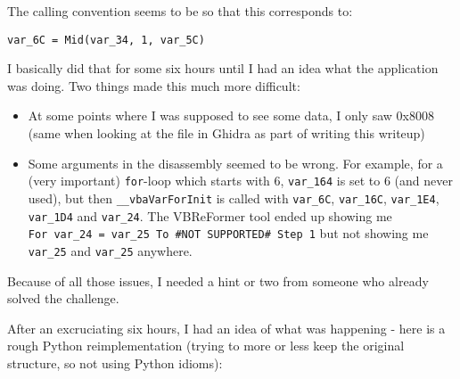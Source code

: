 \documentclass[11pt]{article}
\providecommand{\tightlist}{%
      \setlength{\itemsep}{0pt}\setlength{\parskip}{0pt}}
\begin{document}
The calling convention seems to be so that this corresponds to:

\begin{verbatim}
var_6C = Mid(var_34, 1, var_5C)
\end{verbatim}

I basically did that for some six hours until I had an idea what the
application was doing. Two things made this much more difficult:

\begin{itemize}
\tightlist
\item
  At some points where I was supposed to see some data, I only saw
  0x8008 (same when looking at the file in Ghidra as part of writing
  this writeup)
\item
  Some arguments in the disassembly seemed to be wrong. For example, for
  a (very important) \texttt{for}-loop which starts with 6,
  \texttt{var\_164} is set to 6 (and never used), but then
  \texttt{\_\_vbaVarForInit} is called with \texttt{var\_6C},
  \texttt{var\_16C}, \texttt{var\_1E4}, \texttt{var\_1D4} and
  \texttt{var\_24}. The VBReFormer tool ended up showing me
  \texttt{For\ var\_24\ =\ var\_25\ To\ \#NOT\ SUPPORTED\#\ Step\ 1} but
  not showing me \texttt{var\_25} and \texttt{var\_25} anywhere.
\end{itemize}

Because of all those issues, I needed a hint or two from someone who
already solved the challenge.

After an excruciating six hours, I had an idea of what was happening -
here is a rough Python reimplementation (trying to more or less keep the
original structure, so not using Python idioms):
\end{document}
